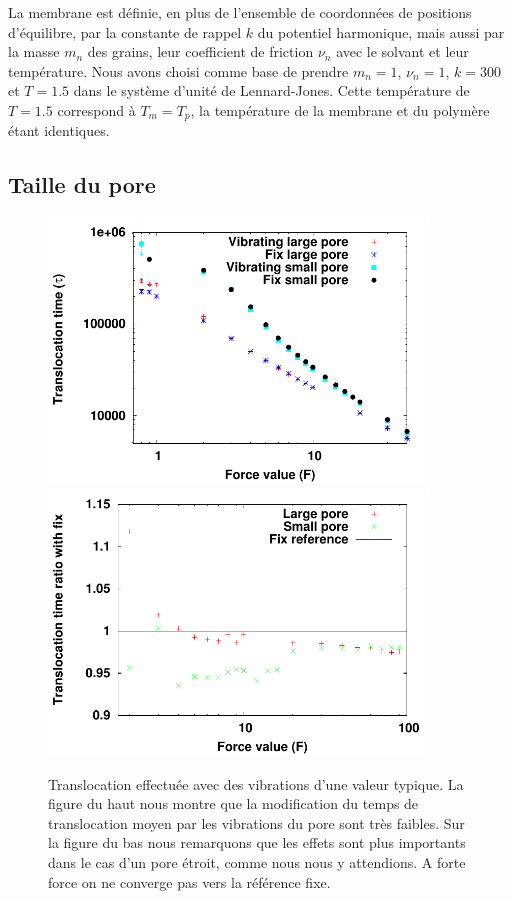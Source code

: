 La membrane est définie, en plus de l'ensemble de coordonnées de positions d'équilibre, par la constante de rappel $k$ du potentiel harmonique, mais aussi par la masse $m_n$ des grains, leur coefficient de friction $\nu_n$ avec le solvant et leur température. Nous avons choisi comme base de prendre $m_n=1$, $\nu_n=1$, $k=300$ et $T=1.5$ dans le système d'unité de Lennard-Jones. Cette température de $T=1.5$ correspond à $T_m=T_p$, la température de la membrane et du polymère étant identiques.


\subsection{Taille du pore}



\begin{figure}[H]
\begin{center}
\includegraphics[width=0.9\textwidth]{allforn16.pdf} \includegraphics[width=0.9\textwidth]{allforn16comp.pdf}

\caption[Vibrations et taille du pore]{Translocation effectuée avec des vibrations d'une valeur typique. La figure du haut nous montre que la modification du temps de translocation moyen par les vibrations du pore sont très faibles. Sur la figure du bas nous remarquons que les effets sont plus importants dans le cas d'un pore étroit, comme nous nous y attendions. A forte force on ne converge pas vers la référence fixe.}
\label{comptailleporevib}
\end{center}
\end{figure}




